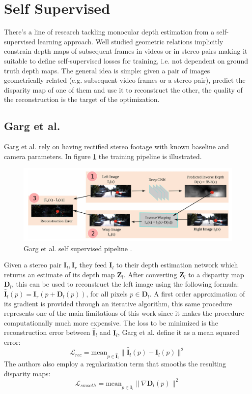 \newpage
\section{Self Supervised}
There's a line of research tackling monocular depth estimation from a self-supervised learning approach.
Well studied geometric relations implicitly constrain depth maps of subsequent frames in videos or in stereo pairs making it suitable to define self-supervised losses for training, i.e. not dependent on ground truth depth maps.
The general idea is simple: given a pair of images geometrically related (e.g. subsequent video frames or a stereo pair), predict the disparity map of one of them and use it to reconstruct the other, the quality of the reconstruction is the target of the optimization.

\subsection{Garg et al.}
Garg et al. \cite{Garg} rely on having rectified stereo footage with known baseline and camera parameters.
In figure \ref{fig:garg} the training pipeline is illustrated.

\begin{figure}
	\centering
	\includegraphics[scale=0.3]{figs/garg}
	\caption{Garg et al. self supervised pipeline \cite{Garg}. \label{fig:garg}}
\end{figure}

Given a stereo pair $\mathbf{I}_{l}, \mathbf{I}_{r}$ they feed $\mathbf{I}_{l}$ to their depth estimation network which returns an estimate of its depth map $\mathbf{Z}_{l}$.
After converting $\mathbf{Z}_{l}$ to a disparity map $\mathbf{D}_{l}$, this can be used to reconstruct the left image using the following formula: $\hat{\mathbf{I}}_{l} (p) = \mathbf{I}_{r} (p + \mathbf{D}_{l}(p))$, for all pixels $p \in \mathbf{D}_{l}$.
A first order approximation of its gradient is provided through an iterative algorithm, this same procedure represents one of the main limitations of this work since it makes the procedure computationally much more expensive.
The loss to be minimized is the reconstruction error between $\hat{\mathbf{I}}_{l}$ and $\mathbf{I}_{l}$, Garg et al. define it as a mean squared error:
\[
	\mathcal{L}_{rec} = \text{mean}_{p \in \hat{\mathbf{I}}_{l}} \big\| \hat{\mathbf{I}}_{l}(p) - \mathbf{I}_{l}(p) \big\|^{2}
\]
The authors also employ a regularization term that smooths the resulting disparity maps:
\[
	\mathcal{L}_{smooth} = \text{mean}_{p \in \hat{\mathbf{I}}_{l}} \big\| \nabla \mathbf{D}_{l} (p) \big\|^{2}
\]

